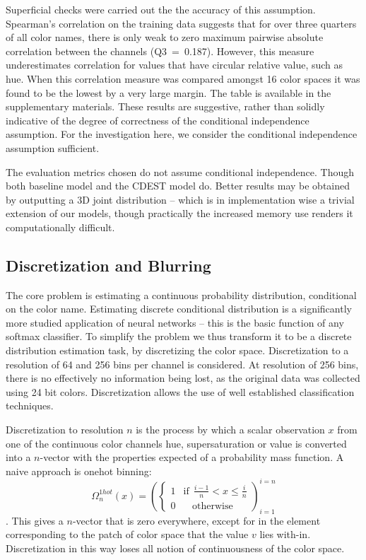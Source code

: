 \documentclass[11pt,letterpaper]{article}
\begin{document}
Superficial checks were carried out the the accuracy of this assumption.
Spearman's correlation on the training data suggests that for over three quarters of all color names, there is only weak to zero maximum pairwise absolute correlation between the channels (\mbox{Q3 = 0.187}).
However, this measure underestimates correlation for values that have circular relative value, such as hue.
When this correlation measure was compared amongst 16 color spaces it was found to be the lowest by a very large margin.
The table is available in the supplementary materials.
These results are suggestive, rather than solidly indicative of the degree of correctness of the conditional independence assumption.
For the investigation here, we consider the conditional independence assumption sufficient.

The evaluation metrics chosen do not assume conditional independence.
Though both baseline model and the CDEST model do.
Better results may be obtained by outputting a 3D joint distribution -- which is in implementation wise a trivial extension of our models, 
though practically the increased memory use renders it computationally difficult.


\subsection{Discretization and Blurring}
The core problem is estimating a continuous  probability distribution, conditional on the color name.
Estimating discrete conditional distribution is a significantly more studied application of neural networks
-- this is the basic function of any softmax classifier.
To simplify the problem we thus transform it to be a discrete distribution estimation task, by discretizing the color space.
Discretization to a resolution of 64 and 256 bins per channel is considered.
At resolution of 256 bins, there is no effectively no information being lost, as the original data was collected using 24 bit colors.
Discretization allows the use of well established classification techniques.

Discretization to resolution $n$ is the process by which a scalar observation $x$ from one of the continuous color channels hue, supersaturation or value is converted into a $n$-vector with the properties expected of a probability mass function.
A naive approach is onehot binning:
\[\Omega_{n}^{1hot}(x)=\left(\begin{cases}
1 & \mathrm{if}\:\:\frac{i-1}{n}<x\le\frac{i}{n}\\
0 & \:\:\:\:\mathrm{otherwise}
\end{cases}\right)_{i=1}^{i=n}
\].
This gives a $n$-vector that is zero everywhere, except for in the element corresponding to the patch of color space that the value $v$ lies with-in.
Discretization in this way loses all notion of continuousness of the color space.
\end{document}
